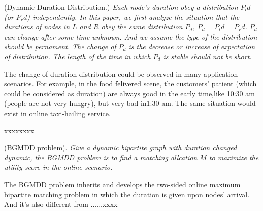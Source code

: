 \begin{definition}
(Dynamic Duration Distribution.) \emph{Each node's duration obey a distribution $P_ld$(or $P_rd$) independently. In this paper, we first analyze the situation that the durations of nodes in  $L$ and $R$ obey the same distribution $P_d$, $P_d=P_ld= P_rd$. $P_d$ can change after some time unknown.  And we assume the type of the distribution should be pernament. The change of $P_d$ is the decrease or increase of expectation of distribution.  The length of the time in which $P_d$ is stable should not be short. }
\end{definition}
\par The change of duration distribution could be observed in many application scenarios. For example, in the food felivered scene, the customers' patient (which could be considered as duration) are always good in the early time,like 10:30 am (people are not very hungry), but very bad in1:30 am. The same situation would exist in online taxi-hailing service.
\begin{example}
xxxxxxxx
\end{example}
\begin{definition}
(BGMDD problem). \emph{Give a dynamic bipartite graph with duration changed dynamic, the BGMDD problem is to find a matching allcation $M$ to maximize the utility score in the online scenario. }
\end{definition}
\par The BGMDD problem inherits and develops the two-sided online maximum bipartite matching problem in which the duration is  given upon nodes' arrival. And it's also different from ......xxxx

